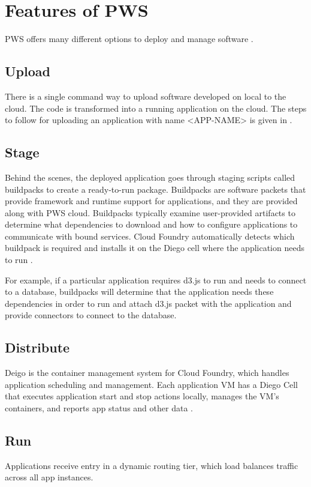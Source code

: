 \documentclass[9pt,twocolumn,twoside]{../../styles/osajnl}
\begin{document}
\section{Features of PWS}

PWS offers many different options to deploy and manage software \cite{www-pws-features}. 

\subsection{Upload}
There is a single command way to upload software developed on local to the cloud. The code is transformed into a running application on the cloud. The steps to follow for uploading an application with name <APP-NAME> is given in \cite{www-pws-push}.
\subsection{Stage}
Behind the scenes, the deployed application goes through staging scripts called buildpacks to create a ready-to-run package. Buildpacks are software packets that provide framework and runtime support for applications, and they are provided along with PWS cloud. Buildpacks typically examine user-provided artifacts to determine what dependencies to download and how to configure applications to communicate with bound services. Cloud Foundry automatically detects which buildpack is required and installs it on the Diego cell where the application needs to run \cite{www-pws-buildpacks}. 

For example, if a particular application requires d3.js to run and needs to connect to a database, buildpacks will determine that the application needs these dependencies in order to run and attach d3.js packet with the application and provide connectors to connect to the database.

\subsection{Distribute}
Deigo is the container management system for Cloud Foundry, which handles application scheduling and management. Each application VM has a Diego Cell that executes application start and stop actions locally, manages the VM’s containers, and reports app status and other data \cite{www-pws-diego}.

\subsection{Run}
Applications receive entry in a dynamic routing tier, which load balances traffic across all app instances. 
\end{document}
